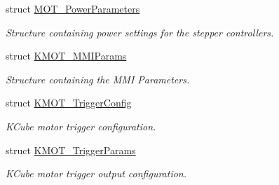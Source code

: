 \begin{DoxyCompactItemize}
struct \hyperlink{struct_m_o_t___power_parameters}{M\+O\+T\+\_\+\+Power\+Parameters}
\begin{DoxyCompactList}\small\item\em Structure containing power settings for the stepper controllers. \end{DoxyCompactList}\item 
struct \hyperlink{struct_k_m_o_t___m_m_i_params}{K\+M\+O\+T\+\_\+\+M\+M\+I\+Params}
\begin{DoxyCompactList}\small\item\em Structure containing the M\+MI Parameters. \end{DoxyCompactList}\item 
struct \hyperlink{struct_k_m_o_t___trigger_config}{K\+M\+O\+T\+\_\+\+Trigger\+Config}
\begin{DoxyCompactList}\small\item\em K\+Cube motor trigger configuration. \end{DoxyCompactList}\item 
struct \hyperlink{struct_k_m_o_t___trigger_params}{K\+M\+O\+T\+\_\+\+Trigger\+Params}
\begin{DoxyCompactList}\small\item\em K\+Cube motor trigger output configuration. \end{DoxyCompactList}\end{DoxyCompactItemize}
